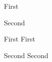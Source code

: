 \documentclass[12pt,]{article}
\begin{document}
\begin{procedureflow}
	\item First
	\item Second
	\begin{procedureflow}
		\item First First
		\item Second Second\label{mylabel}
	\end{procedureflow}
\end{procedureflow}
\end{document}
